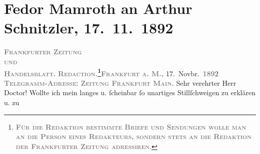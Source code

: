 

         
         \newcommand{\erwaehntePersonen}{Personen: Rudolf Lothar, Eduard Sack}
         \newcommand{\erwaehnteInstitutionen}{Institutionen: Frankfurter Städtisches Schauspielhaus, Frankfurter Zeitung}
         \newcommand{\erwaehnteOrte}{Orte: Berlin, Frankfurt am Main, Wien}
         \newcommand{\erwaehnteWerke}{Werke: Anatol, Cäsar Borgia’s Ende, Das Märchen. Schauspiel in drei Aufzügen, Sterben. Novelle}
               \section[Fedor Mamroth an Arthur Schnitzler, 17. 11. 1892]{ Fedor Mamroth an Arthur Schnitzler, 17. 11. 1892}\nopagebreak{}\rehead{ }\begin{ledgroupsized}[t]{13cm}\normalsize\beginnumbering \toendnotes[C]{\smallbreak\pagebreak[2]} 
\toendnotes[C]{\smallbreak}\pstart
           \noindent{}{\pb}\textcolor{gray}{\textbf{\textsc{Frankfurter Zeitung}}}{\\}\textsc{\textcolor{gray}{\textbf{und}}}{\\}\textcolor{gray}{\textbf{\textsc{Handelsblatt.}}}\pend
           \pstart
           \textcolor{gray}{\textbf{\textsc{Redaction.\footnote{\noindent{}\textcolor{gray}{\textbf{\textsc{Für die Redaktion bestimmte
                                                  Briefe und Sendungen wolle man  an die Person eines
                                                  Redakteurs, sondern stets \textbf{an die
                                                  Redaktion der Frankfurter Zeitung}
                                                  adressiren}}}.}}}}\hfill \textcolor{gray}{\textbf{\textsc{Frankfurt a. M.,}}}{ }17. Novbr. \textsc{\textcolor{gray}{\textbf{189}}}2\pend
           \pstart
           \textcolor{gray}{\textbf{\textsc{Telegramm-Adresse:}}}\pend
           \pstart
           \textcolor{gray}{\textbf{\textsc{Zeitung Frankfurt Main.}}}\pend
           \pstart{}Sehr verehrter Herr Doctor!\pend\pstart
           Wollte ich mein langes u. ſcheinbar ſo unartiges Stillſchweigen zu erklären u. zu

\end{ledgroupsized}
